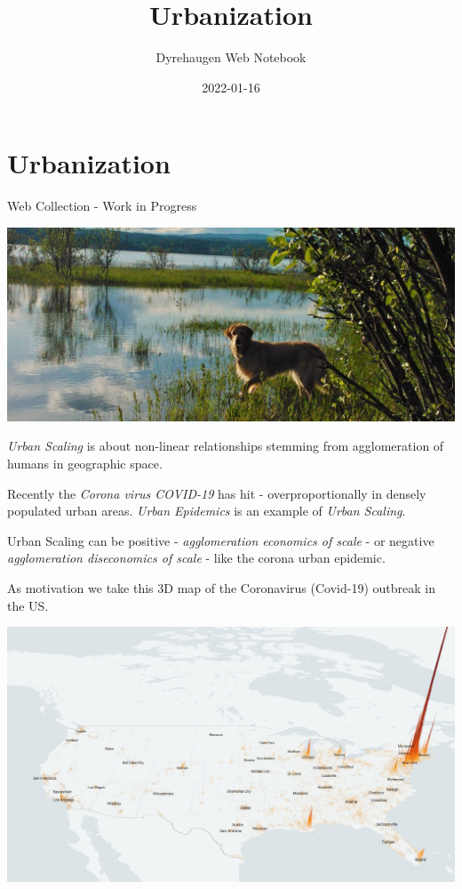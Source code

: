 \documentclass[
]{book}
\title{Urbanization}
\author{Dyrehaugen Web Notebook}
\date{2022-01-16}
\begin{document}
\maketitle

{
\setcounter{tocdepth}{1}
\tableofcontents
}
\hypertarget{urbanization}{%
\chapter{Urbanization}\label{urbanization}}

Web Collection - Work in Progress

\includegraphics{fig/zelda.jpg}

\emph{Urban Scaling} is about non-linear relationships stemming from agglomeration of humans
in geographic space.

Recently the \emph{Corona virus COVID-19} has hit - overproportionally in densely populated urban areas.
\emph{Urban Epidemics} is an example of \emph{Urban Scaling}.

Urban Scaling can be positive - \emph{agglomeration economics of scale} - or negative
\emph{agglomeration diseconomics of scale} - like the corona urban epidemic.

As motivation we take this 3D map of the Coronavirus (Covid-19) outbreak in the US.

\includegraphics{fig/Corona_Cases_pc_US_3D.jpeg}
\end{document}

